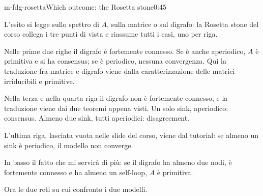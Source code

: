 \begin{slide}{m-fdg-rosetta}{Which outcome: the Rosetta stone\spostata}{0:45 {\color{red}}}
  \begin{discorso}
    \item L'esito si legge sullo spettro di $A$, sulla matrice o sul digrafo: la Rosetta stone del corso collega i tre punti di {\color{red}} {\color{blue}vista} e {\color{red}      } {\color{blue}riassume tutti i casi, uno per riga.}
    \item {\color{blue}Nelle prime due righe il digrafo è fortemente connesso. Se è anche aperiodico, $A$ è primitiva e si ha consensus; se è periodico, nessuna convergenza. Qui la traduzione fra matrice e digrafo viene dalla caratterizzazione delle matrici irriducibili e primitive.}
    \item {\color{blue}Nella terza e nella quarta riga il digrafo non è fortemente connesso, e la traduzione viene dai due teoremi appena visti. Un solo sink, aperiodico: consensus. Almeno due sink, tutti aperiodici: disagreement.}
    \item {\color{red}             }
    \item {\color{red}                          }
    \item {\color{red}           } {\color{blue}L'ultima riga, lasciata vuota nelle slide del corso, viene dal tutorial: se} almeno un sink è periodico, il modello non converge.
    \item In basso il fatto che mi servirà di più: se il digrafo {\color{blue}ha almeno due nodi,} è fortemente connesso e ha almeno un self-loop, $A$ è primitiva.
    \item {\color{blue}Ora le due reti su cui confronto i due modelli.}
    \item {\color{red}                         }
  \end{discorso}
\end{slide}


